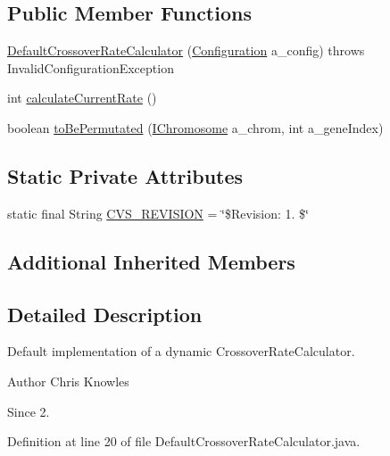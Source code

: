 \subsection*{Public Member Functions}
\begin{DoxyCompactItemize}
\item 
\hyperlink{classorg_1_1jgap_1_1impl_1_1_default_crossover_rate_calculator_a4d2cf2901043011a71d5b58d2e311361}{Default\-Crossover\-Rate\-Calculator} (\hyperlink{classorg_1_1jgap_1_1_configuration}{Configuration} a\-\_\-config)  throws Invalid\-Configuration\-Exception 
\item 
int \hyperlink{classorg_1_1jgap_1_1impl_1_1_default_crossover_rate_calculator_aef0524d98b295adf06ab42c56bf0a305}{calculate\-Current\-Rate} ()
\item 
boolean \hyperlink{classorg_1_1jgap_1_1impl_1_1_default_crossover_rate_calculator_a317fd5cc914427338adf2e3d72b9a89d}{to\-Be\-Permutated} (\hyperlink{interfaceorg_1_1jgap_1_1_i_chromosome}{I\-Chromosome} a\-\_\-chrom, int a\-\_\-gene\-Index)
\end{DoxyCompactItemize}
\subsection*{Static Private Attributes}
\begin{DoxyCompactItemize}
\item 
static final String \hyperlink{classorg_1_1jgap_1_1impl_1_1_default_crossover_rate_calculator_ac4d7435038e53143b029c981d0d0d6f6}{C\-V\-S\-\_\-\-R\-E\-V\-I\-S\-I\-O\-N} = \char`\"{}\$Revision\-: 1. \$\char`\"{}
\end{DoxyCompactItemize}
\subsection*{Additional Inherited Members}


\subsection{Detailed Description}
Default implementation of a dynamic Crossover\-Rate\-Calculator.

\begin{DoxyAuthor}{Author}
Chris Knowles 
\end{DoxyAuthor}
\begin{DoxySince}{Since}
2. 
\end{DoxySince}


Definition at line 20 of file Default\-Crossover\-Rate\-Calculator.\-java.



